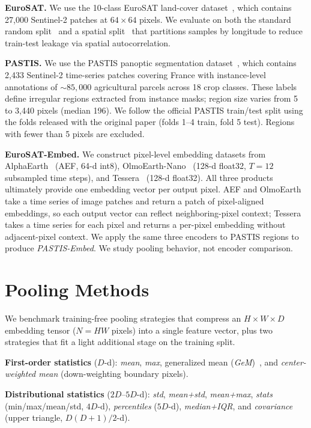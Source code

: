 \documentclass[journal]{IEEEtran}
\begin{document}
\textbf{EuroSAT.} We use the 10-class EuroSAT land-cover dataset~\cite{helber2019eurosat}, which contains 27{,}000 Sentinel-2 patches at $64{\times}64$ pixels. We evaluate on both the standard random split~\cite{neumann2019domain} and a spatial split~\cite{ekim2025distribution,roberts2017cross} that partitions samples by longitude to reduce train-test leakage via spatial autocorrelation.

\textbf{PASTIS.} We use the PASTIS panoptic segmentation dataset~\cite{garnot2021panoptic}, which contains 2{,}433 Sentinel-2 time-series patches covering France with instance-level annotations of ${\sim}85{,}000$ agricultural parcels across 18 crop classes. These labels define irregular regions extracted from instance masks; region size varies from 5 to 3{,}440 pixels (median 196). We follow the official PASTIS train/test split using the folds released with the original paper (folds 1--4 train, fold 5 test). Regions with fewer than 5 pixels are excluded.

\textbf{EuroSAT-Embed.} We construct pixel-level embedding datasets from AlphaEarth~\cite{brown2025alphaearth} (AEF, 64-d int8), OlmoEarth-Nano~\cite{herzog2025olmoearth} (128-d float32, $T{=}12$ subsampled time steps), and Tessera~\cite{feng2025tesseratemporalembeddingssurface} (128-d float32). All three products ultimately provide one embedding vector per output pixel. AEF and OlmoEarth take a time series of image patches and return a patch of pixel-aligned embeddings, so each output vector can reflect neighboring-pixel context; Tessera takes a time series for each pixel and returns a per-pixel embedding without adjacent-pixel context. We apply the same three encoders to PASTIS regions to produce \emph{PASTIS-Embed}. We study pooling behavior, not encoder comparison.

\section{Pooling Methods}

We benchmark training-free pooling strategies that compress an $H{\times}W{\times}D$ embedding tensor ($N{=}HW$ pixels) into a single feature vector, plus two strategies that fit a light additional stage on the training split.

\textbf{First-order statistics} ($D$-d): \textit{mean}, \textit{max}, generalized mean (\textit{GeM})~\cite{radenovic2018gem}, and \textit{center-weighted mean} (down-weighting boundary pixels).

\textbf{Distributional statistics} ($2D$--$5D$-d): \textit{std}, \textit{mean+std}, \textit{mean+max}, \textit{stats} (min/max/mean/std, $4D$-d), \textit{percentiles} ($5D$-d), \textit{median+IQR}, and \textit{covariance}~\cite{lin2015bilinear} (upper triangle, $D(D{+}1)/2$-d).
\end{document}
